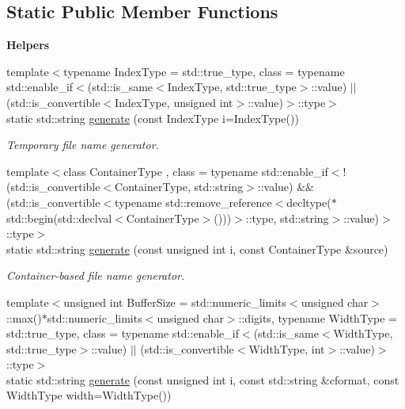 \subsection*{Static Public Member Functions}
\begin{Indent}{\bf Helpers}\par
\begin{DoxyCompactItemize}
\item 
{\footnotesize template$<$typename Index\-Type  = std\-::true\-\_\-type, class  = typename std\-::enable\-\_\-if$<$(std\-::is\-\_\-same$<$\-Index\-Type, std\-::true\-\_\-type$>$\-::value) $|$$|$ (std\-::is\-\_\-convertible$<$\-Index\-Type, unsigned int$>$\-::value)$>$\-::type$>$ }\\static std\-::string \hyperlink{exceptionmagrathea_1_1FileList_aa8b8bcd9831bf39e357270f2db99ff09}{generate} (const Index\-Type i=Index\-Type())
\begin{DoxyCompactList}\small\item\em Temporary file name generator. \end{DoxyCompactList}\item 
{\footnotesize template$<$class Container\-Type , class  = typename std\-::enable\-\_\-if$<$!(std\-::is\-\_\-convertible$<$\-Container\-Type, std\-::string$>$\-::value) \&\& (std\-::is\-\_\-convertible$<$typename std\-::remove\-\_\-reference$<$decltype($\ast$std\-::begin(std\-::declval$<$\-Container\-Type$>$()))$>$\-::type, std\-::string$>$\-::value)$>$\-::type$>$ }\\static std\-::string \hyperlink{exceptionmagrathea_1_1FileList_a3bef23c9e62770cd22b169117f32f3d4}{generate} (const unsigned int i, const Container\-Type \&source)
\begin{DoxyCompactList}\small\item\em Container-\/based file name generator. \end{DoxyCompactList}\item 
{\footnotesize template$<$unsigned int Buffer\-Size = std\-::numeric\-\_\-limits$<$unsigned char$>$\-::max()$\ast$std\-::numeric\-\_\-limits$<$unsigned char$>$\-::digits, typename Width\-Type  = std\-::true\-\_\-type, class  = typename std\-::enable\-\_\-if$<$(std\-::is\-\_\-same$<$\-Width\-Type, std\-::true\-\_\-type$>$\-::value) $|$$|$ (std\-::is\-\_\-convertible$<$\-Width\-Type, int$>$\-::value)$>$\-::type$>$ }\\static std\-::string \hyperlink{exceptionmagrathea_1_1FileList_a416c3f6db95610900f338f26f948de34}{generate} (const unsigned int i, const std\-::string \&cformat, const Width\-Type width=Width\-Type())

\end{DoxyCompactItemize}
\end{Indent}
